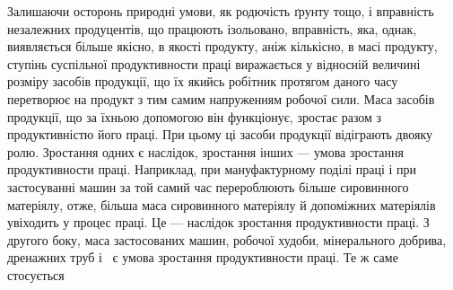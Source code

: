 Залишаючи осторонь природні умови, як родючість ґрунту
тощо, і вправність незалежних продуцентів, що працюють ізольовано,
вправність, яка, од\-нак, виявляється більше якісно, в якості
продукту, аніж кількісно, в масі продукту, ступінь суспільної
продуктивности праці виражається у відносній величині розміру
засобів продукції, що їх якийсь робітник протягом даного часу
перетворює на продукт з тим самим напруженням робочої сили.
Маса засобів продукції, що за їхньою допомогою він функціонує,
зростає разом з продуктивністю його праці. При цьому ці засоби
продукції відіграють двояку ролю. Зростання одних є наслідок,
зростання інших — умова зростання продуктивности праці.
Наприклад, при мануфактурному поділі праці і при застосуванні
машин за той самий час перероблюють більше сировинного матеріялу,
отже, більша маса сировинного матеріялу й допоміжних
матеріялів увіходить у процес праці. Це — наслідок зростання
продуктивности праці. З другого боку, маса застосованих машин,
робочої худоби, мінерального добрива, дренажних труб і~
є умова зростання продуктивности праці. Те ж саме стосується
\parbreak{}  %

